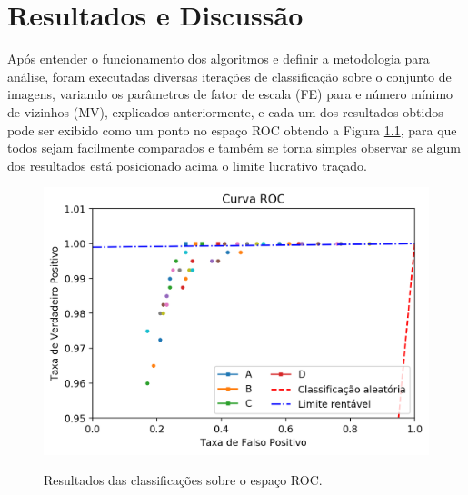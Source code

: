 \chapter{Resultados e Discussão}\label{cap:resultados}

Após entender o funcionamento dos algoritmos e definir a metodologia para análise, foram executadas diversas iterações de classificação sobre o conjunto de imagens, variando os parâmetros de fator de escala (FE) para e número mínimo de vizinhos (MV), explicados anteriormente, e cada um dos resultados obtidos pode ser exibido como um ponto no espaço ROC obtendo a Figura \ref{fig:results_roc}, para que todos sejam facilmente comparados e também se torna simples observar se algum dos resultados está posicionado acima o limite lucrativo traçado.

\begin{figure}[htbp]
    \centering
    \caption{Resultados das classificações sobre o espaço ROC.}
    \includegraphics[scale=1]{figs/curva_roc_results.png}
    \label{fig:results_roc}
\end{figure}


